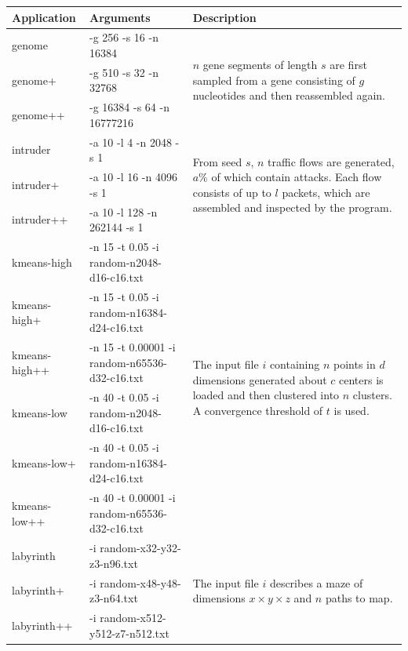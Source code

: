 \begin{table}
    \centering
    \tiny
    \begin{tabular}{|l l l|}
        \hline
        \textbf{Application} & \textbf{Arguments} & \textbf{Description}\\\hline\hline
        genome & -g 256 -s 16 -n 16384 & \multirow{3}{*}{\begin{minipage}{.4\textwidth}$n$ gene segments of length $s$ are first sampled from a gene consisting of $g$ nucleotides and then reassembled again.\end{minipage}}\\
        genome+ & -g 510 -s 32 -n 32768 & \\
        genome++ & -g 16384 -s 64 -n 16777216 & \\\hline

        intruder & -a 10 -l 4 -n 2048 -s 1 & \multirow{3}{*}{\begin{minipage}{.4\textwidth}From seed $s$, $n$ traffic flows are generated, $a\%$ of which contain attacks. Each flow consists of up to $l$ packets, which are assembled and inspected by the program.\end{minipage}}\\
        intruder+ & -a 10 -l 16 -n 4096 -s 1 & \\
        intruder++ & -a 10 -l 128 -n 262144 -s 1 & \\\hline

        kmeans-high & -n 15 -t 0.05 -i random-n2048-d16-c16.txt & \multirow{6}{*}{\begin{minipage}{.4\textwidth}The input file $i$ containing $n$ points in $d$ dimensions generated about $c$ centers is loaded and then clustered into $n$ clusters. A convergence threshold of $t$ is used.\end{minipage}}\\
        kmeans-high+ & -n 15 -t 0.05 -i random-n16384-d24-c16.txt & \\
        kmeans-high++ & -n 15 -t 0.00001 -i random-n65536-d32-c16.txt & \\
        kmeans-low & -n 40 -t 0.05 -i random-n2048-d16-c16.txt & \\
        kmeans-low+ & -n 40 -t 0.05 -i random-n16384-d24-c16.txt & \\
        kmeans-low++ & -n 40 -t 0.00001 -i random-n65536-d32-c16.txt & \\\hline

        labyrinth & -i random-x32-y32-z3-n96.txt & \multirow{3}{*}{\begin{minipage}{.4\textwidth}The input file $i$ describes a maze of dimensions $x \times y \times z$ and $n$ paths to map.\end{minipage}}\\
        labyrinth+ & -i random-x48-y48-z3-n64.txt & \\
        labyrinth++ & -i random-x512-y512-z7-n512.txt & \\\hline
    \end{tabular}


\end{table}

